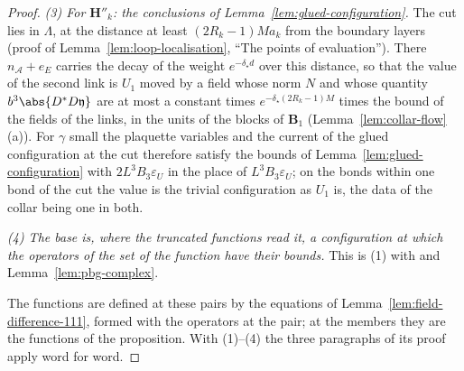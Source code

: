 \begin{proof}
\emph{(3) For $\mathbf H''_k$: the conclusions of Lemma~\ref{lem:glued-configuration}.} The cut lies in $\Lambda$, at the distance at least $(2R_k - 1)Ma_k$ from the boundary layers (proof of Lemma~\ref{lem:loop-localisation}, ``The points of evaluation''). There $n_{\mathcal A} + e_E$ carries the decay of the weight $e^{-\delta_\star d}$ over this distance, so that the value of the second link is $U_1$ moved by a field whose norm $N$ and whose quantity $b^3\abs{D^*D\mathfrak y}$ are at most a constant times $e^{-\delta_\star(2R_k-1)M}$ times the bound of the fields of the links, in the units of the blocks of $\mathbf B_1$ (Lemma~\ref{lem:collar-flow}(a)). For $\gamma$ small the plaquette variables and the current of the glued configuration at the cut therefore satisfy the bounds of Lemma~\ref{lem:glued-configuration} with $2L^3B_3\varepsilon_U$ in the place of $L^3B_3\varepsilon_U$; on the bonds within one bond of the cut the value is the trivial configuration as $U_1$ is, the data of the collar being one in both.

\emph{(4) The base is, where the truncated functions read it, a configuration at which the operators of the set of the function have their bounds.} This is (1) with \cite[Theorem~3.4, p.~400]{BalabanPBG} and Lemma~\ref{lem:pbg-complex}.

The functions are defined at these pairs by the equations of Lemma~\ref{lem:field-difference-111}, formed with the operators at the pair; at the members they are the functions of the proposition. With (1)--(4) the three paragraphs of its proof apply word for word.
\end{proof}

